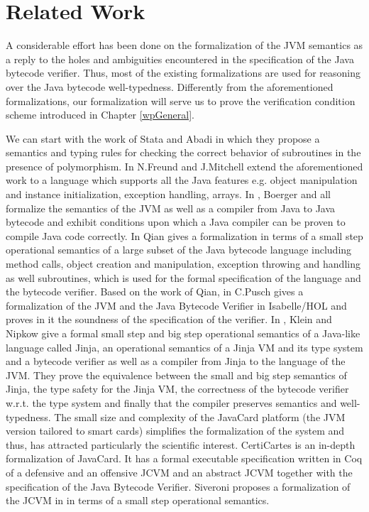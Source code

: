 \section{Related Work}\label{relWork}
 A considerable effort has been done on the formalization of 
 the JVM semantics as a reply to the holes and ambiguities encountered in
 the specification of the Java bytecode verifier. 
 Thus,  most of the existing formalizations are
 used for reasoning over the Java bytecode well-typedness.
  Differently from the aforementioned formalizations, our formalization will serve us to prove the verification condition scheme introduced 
in Chapter \ref{wpGeneral}. 

 We can start with the work of Stata and Abadi \cite{stata98type} in which they propose a semantics  and 
  typing rules for checking the correct behavior of  subroutines in the presence of polymorphism.
 In \cite{FM99FFJ}  N.Freund and J.Mitchell extend the aforementioned work to 
 a language which supports all the Java features e.g.
 object manipulation and instance initialization, exception handling, arrays.
In \cite{borger98defining}, Boerger and all formalize the semantics of the JVM as
well as a compiler from Java to Java bytecode and exhibit conditions upon which a Java compiler
can be proven to compile Java code correctly.
 In \cite{qian99formal}  Qian  gives a formalization in terms of a small step operational semantics of a
 large subset of the Java bytecode language including method calls, object creation and manipulation,
 exception throwing and handling as well subroutines, which is used for the formal specification of the language and the bytecode verifier.
 Based on the work of Qian, in \cite{pusch98proving} C.Pusch gives a formalization of the JVM and the Java Bytecode Verifier
 in Isabelle/HOL and proves in it the soundness of the specification of the verifier.
 In \cite{KleinN04}, Klein and Nipkow give a formal small step and big step operational
 semantics of a Java-like language called Jinja, an operational semantics of a Jinja VM and its type system and a bytecode verifier as well as 
 a compiler from Jinja to the language of the JVM. They prove the equivalence between the small and big step
 semantics of Jinja, the  type safety for the Jinja VM, the correctness of the bytecode verifier w.r.t. the type system
 and finally that the compiler preserves semantics and well-typedness.
  The small size and complexity of the JavaCard platform (the JVM version tailored to smart cards) 
 simplifies the formalization of the system and thus,
 has attracted  particularly the scientific interest. CertiCartes \cite{barthe01formal,barthe02formal}
 is an in-depth formalization of JavaCard. It has a formal executable
 specification written in Coq of a defensive and an offensive JCVM and an abstract JCVM together with the specification
 of the Java Bytecode Verifier.  Siveroni proposes a formalization of the JCVM in \cite{siveroni04operational} in terms of
 a small step operational semantics. 

